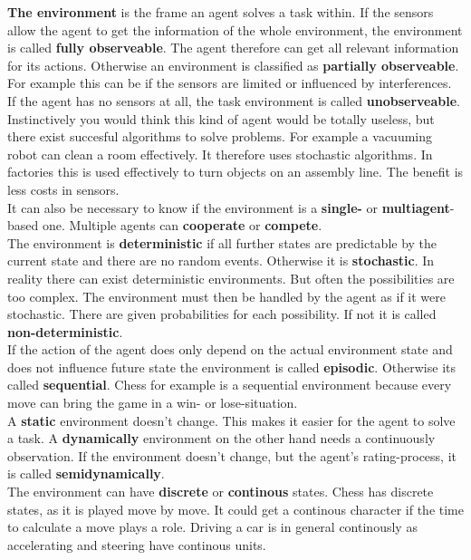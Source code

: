 \documentclass[10pt,a4paper,DIV=11]{scrreprt}
\begin{document}
\textbf{The environment} is the frame an agent solves a task within.
If the sensors allow the agent to get the information of the whole environment, the environment is called \textbf{fully observeable}. The agent therefore can get all relevant information for its actions. Otherwise an environment is classified as \textbf{partially observeable}. For example this can be if the sensors are limited or influenced by interferences.
If the agent has no sensors at all, the task environment is called \textbf{unobserveable}. Instinctively you would think this kind of agent would be totally useless, but there exist succesful algorithms to solve problems. For example a vacuuming robot can clean a room effectively. It therefore uses stochastic algorithms. In factories this is used effectively to turn objects on an assembly line. The benefit is less costs in sensors. \\

It can also be necessary to know if the environment is a \textbf{single-} or \textbf{multiagent}-based one. Multiple agents can \textbf{cooperate} or \textbf{compete}. \\

The environment is \textbf{deterministic} if all further states are predictable by the current state and there are no random events. Otherwise it is \textbf{stochastic}. In reality there can exist deterministic environments. But often the possibilities are too complex. The environment must then be handled by the agent as if it were stochastic. There are given probabilities for each possibility. If not it is called \textbf{non-deterministic}. \\

If the action of the agent does only depend on the actual environment state and does not influence future state the environment is called \textbf{episodic}. Otherwise its called
\textbf{sequential}. Chess for example is a sequential environment because every move can bring the game in a win- or lose-situation. \\

A \textbf{static} environment doesn't change. This makes it easier for the agent to solve a task. A \textbf{dynamically} environment on the other hand needs a continuously observation. If the environment doesn't change, but the agent's rating-process, it is called \textbf{semidynamically}. \\

The environment can have \textbf{discrete} or \textbf{continous} states. Chess has discrete states, as it is played move by move. It could get a continous character if the time to calculate a move plays a role. Driving a car is in general continously as accelerating and steering have continous units.\\
\end{document}
